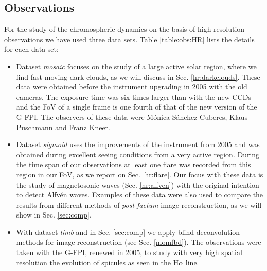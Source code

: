 \subsection{Observations}
For the study of the chromospheric dynamics on the basis of high resolution observations we have used three  data sets. Table \ref{table:obs:HR} lists the details for each data set:
\begin{itemize}
\item Dataset \textit{mosaic} focuses on the study of a large active solar region, where we find fast moving dark clouds, as we will discuss in Sec. \ref{hr:darkclouds}. These data were obtained before the instrument upgrading in 2005 \citep{2006A&A...451.1151P} with the old cameras. The exposure time was six times larger than with the new CCDs and the FoV of a single frame is one fourth of that of the new version of the G-FPI. The observers of these data were M\'onica S\'anchez Cuberes, Klaus Puschmann and Franz Kneer.

\item Dataset \textit{sigmoid} uses the improvements of the instrument from 2005 and was obtained during excellent seeing conditions from a very active region. During the time span of our observations at least one flare was recorded from this region in our FoV, as we report on Sec. \ref{hr:flare}. Our focus with these data is the study of magnetosonic waves (Sec. \ref{hr:alfven}) with the original intention to detect Alfv\'en waves. Examples of these data were also used to compare the results from different methods of \emph{post-factum} image reconstruction, as we will show in Sec. \ref{sec:comp}.

\item With dataset \textit{limb} and in Sec. \ref{sec:comp} we apply blind deconvolution methods for image reconstruction (see Sec. \ref{momfbd}). The observations were taken with the G-FPI, renewed in 2005, to study with very high spatial resolution the evolution of spicules as seen in the H$\alpha$ line.
\end{itemize}


